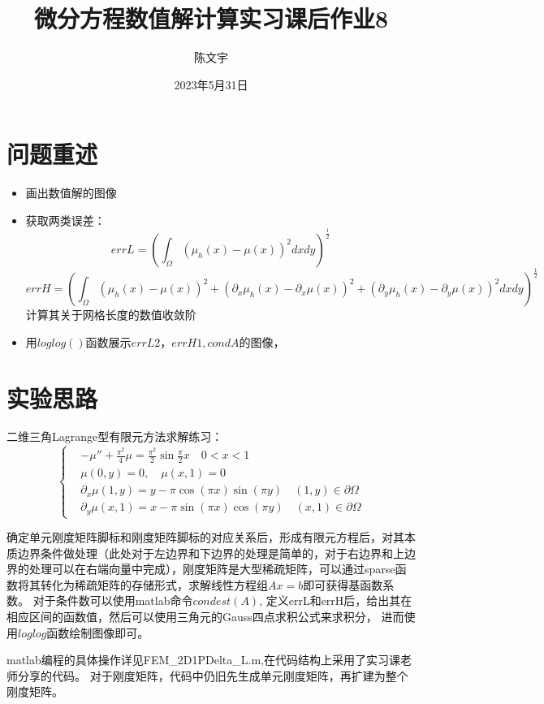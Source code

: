 \documentclass{ctexart}
\title{微分方程数值解计算实习课后作业8}
\author{陈文宇}
\date{2023年5月31日}
\begin{document}
\maketitle

\tableofcontents

\newpage
\section{问题重述}

\begin{itemize}
    \item 画出数值解的图像
    \item 获取两类误差：
    $$ errL=(\int_{\Omega}(\mu_{h}(x)-\mu(x))^{2}dxdy)^{\frac{1}{2}}$$
    $$ errH=(\int_{\Omega}(\mu_{h}(x)-\mu(x))^{2}+(\partial_{x}\mu_{h}(x)-\partial_{x}\mu(x))^{2}+(\partial_{y}\mu_{h}(x)-\partial_{y}\mu(x))^{2}dxdy)^{\frac{1}{2}}$$
    计算其关于网格长度的数值收敛阶
    \item 用$loglog()$函数展示$errL2，errH1,condA$的图像，
\end{itemize}
 
\section{实验思路}
二维三角Lagrange型有限元方法求解练习：
\[
\left\{
\begin{aligned}
	&-\mu '' + \frac{\pi^{2}}{4}\mu = \frac{\pi^{2}}{2}\sin{\frac{\pi}{2}x} \quad0<x<1 
	\\
	&\mu(0,y)=0 ,\quad \mu(x,1)=0 
        \\
        &\partial_{x}\mu(1,y)=y-\pi\cos(\pi x)\sin(\pi y) \quad (1,y)\in\partial\Omega
        \\
        &\partial_{y}\mu(x,1)=x-\pi\sin(\pi x)\cos(\pi y) \quad (x,1)\in\partial\Omega
\end{aligned}
\right.
\]

确定单元刚度矩阵脚标和刚度矩阵脚标的对应关系后，形成有限元方程后，对其本质边界条件做处理（此处对于左边界和下边界的处理是简单的，对于右边界和上边界的处理可以在右端向量中完成），刚度矩阵是大型稀疏矩阵，可以通过sparse函数将其转化为稀疏矩阵的存储形式，求解线性方程组$Ax=b$即可获得基函数系数。
对于条件数可以使用matlab命令$condest(A)$,
定义errL和errH后，给出其在相应区间的函数值，然后可以使用三角元的Gauss四点求积公式来求积分，
进而使用$loglog$函数绘制图像即可。

matlab编程的具体操作详见FEM\_2D1PDelta\_L.m,在代码结构上采用了实习课老师分享的代码。
对于刚度矩阵，代码中仍旧先生成单元刚度矩阵，再扩建为整个刚度矩阵。
\end{document}
